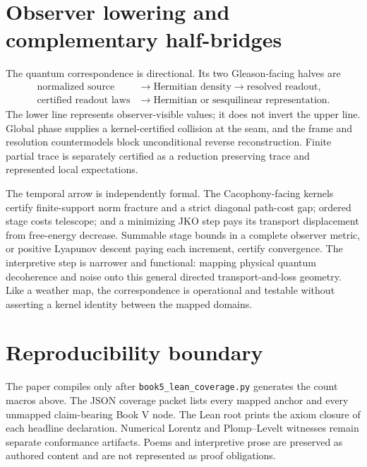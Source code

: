 \documentclass[11pt]{article}
\begin{document}
\section{Observer lowering and complementary half-bridges}

The quantum correspondence is directional.  Its two Gleason-facing halves are
\[
\begin{aligned}
\text{normalized source} &\longrightarrow \text{Hermitian density}
  \longrightarrow \text{resolved readout},\\
\text{certified readout laws} &\longrightarrow
  \text{Hermitian or sesquilinear representation}.
\end{aligned}
\]
The lower line represents observer-visible values; it does not invert the upper
line.  Global phase supplies a kernel-certified collision at the seam, and the
frame and resolution countermodels block unconditional reverse reconstruction.
Finite partial trace is separately certified as a reduction preserving trace and
represented local expectations.

The temporal arrow is independently formal.  The Cacophony-facing kernels certify
finite-support norm fracture and a strict diagonal path-cost gap; ordered stage costs
telescope; and a minimizing JKO step pays its transport displacement from free-energy
decrease.  Summable stage bounds in a complete observer metric, or positive
Lyapunov descent paying each increment, certify convergence.  The interpretive step
is narrower and functional: mapping physical quantum decoherence and noise onto
this general directed transport-and-loss geometry.  Like a weather map, the
correspondence is operational and testable without asserting a kernel identity between
the mapped domains.

\section{Reproducibility boundary}

The paper compiles only after
\texttt{book5\_lean\_coverage.py} generates the count macros above.
The JSON coverage packet lists every mapped anchor and every unmapped
claim-bearing Book V node.  The Lean root prints the axiom closure of each
headline declaration.  Numerical Lorentz and Plomp--Levelt witnesses remain
separate conformance artifacts.  Poems and interpretive prose are preserved as
authored content and are not represented as proof obligations.
\end{document}
